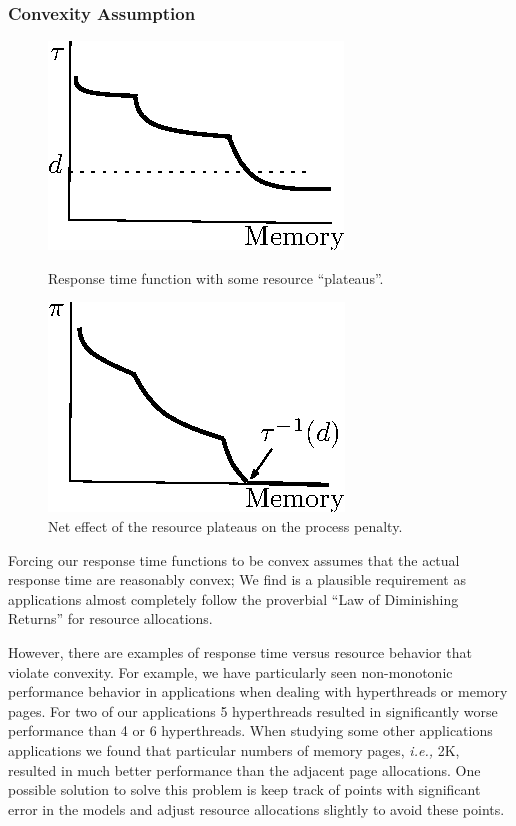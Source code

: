 \subsubsection*{Convexity Assumption}
\begin{figure}[hb]
\parbox{1.6in}{
\includegraphics*{Plateau1.eps}
\caption{\label{f:plat}Response time function with some resource ``plateaus''.}
}
\hspace{\fill}
\parbox{1.6in}{
\includegraphics*{Plateau2.eps}
\caption{\label{f:plateffect}Net effect of the resource plateaus on the process penalty.}
}
\end{figure}

Forcing our response time functions to be convex assumes that the actual response time are reasonably convex; We find is a plausible requirement as applications almost completely follow the proverbial ``Law of Diminishing Returns'' for resource allocations.   

However, there are examples of response time versus resource behavior that violate convexity.   For example, we have particularly seen non-monotonic performance behavior in applications when dealing with hyperthreads or memory pages.  For two of our applications 5 hyperthreads resulted in significantly worse performance than 4 or 6 hyperthreads.  When studying some other applications applications we found that particular numbers of memory pages, \emph{i.e.,} 2K, resulted in much better performance than the adjacent page allocations.  One possible solution to solve this problem is keep track of points with significant error in the models and adjust resource allocations slightly to avoid these points.

